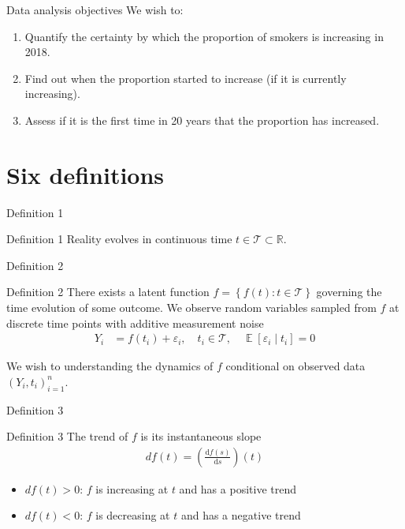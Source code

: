 \documentclass[ignorenonframetext,xcolor=pdflatex,table,dvipsnames,serif]{beamer}
\DeclareMathOperator{\E}{\mathbb{E}}
\begin{document}
\begin{frame}{Data analysis objectives}
We wish to:
  \begin{enumerate}
    \item{Quantify the certainty by which the proportion of smokers is increasing in 2018.}
	\item{Find out when the proportion started to increase (if it is currently increasing).}
	\item{Assess if it is the first time in 20 years that the proportion has increased.}
  \end{enumerate}	  
\end{frame}


\section{Six definitions}

\begin{frame}{Definition 1}
\begin{alertblock}{Definition 1}
  Reality evolves in continuous time $t \in \mathcal{T} \subset \mathbb{R}$.
\end{alertblock}  
\end{frame}


\begin{frame}{Definition 2}
\begin{alertblock}{Definition 2}
  There exists a latent function $f = \left\{f(t) : t \in \mathcal{T}\right\}$ governing the time evolution of some outcome. We observe random variables sampled from $f$ at discrete time points with additive measurement noise
  \begin{align*}
	  Y_i &= f(t_i) + \varepsilon_i, \quad t_i \in \mathcal{T}, \quad \E[\varepsilon_i \mid t_i] = 0
  \end{align*}
  
  We wish to understanding the dynamics of $f$ conditional on observed data $(Y_i, t_i)_{i=1}^{n}$.  
\end{alertblock}    
\end{frame}



\begin{frame}{Definition 3}
\begin{alertblock}{Definition 3}
  The \alert{trend} of $f$ is its instantaneous slope
  \begin{align*}
	  df(t) = \left(\frac{\mathrm{d} f(s)}{\mathrm{d}s}\right)(t)
  \end{align*}
  \begin{itemize}
    \item{$df(t) > 0$: $f$ is increasing at $t$ and has a \alert{positive trend}}
	\item{$df(t) < 0$: $f$ is decreasing at $t$ and has a \alert{negative trend}}
  \end{itemize}
\end{alertblock}    
\end{frame}
\end{document}
